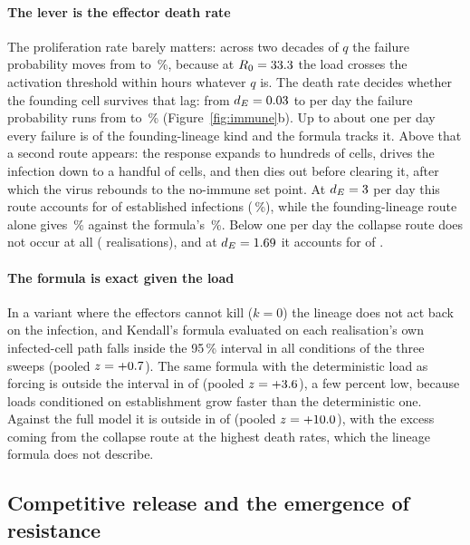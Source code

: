\paragraph{The lever is the effector death rate}
The proliferation rate barely matters: across two decades of $q$ the failure probability moves from \ImmFailQLow{} to \ImmFailQHigh\,\%, because at $R_0 = 33.3$ the load crosses the activation threshold within hours whatever $q$ is. The death rate decides whether the founding cell survives that lag: from $d_E = 0.03$ to \ImmDeMax{} per day the failure probability runs from \ImmFailDeMin{} to \ImmFailDeMax\,\% (Figure~\ref{fig:immune}b). Up to about one per day every failure is of the founding-lineage kind and the formula tracks it. Above that a second route appears: the response expands to hundreds of cells, drives the infection down to a handful of cells, and then dies out before clearing it, after which the virus rebounds to the no-immune set point. At $d_E = 3$ per day this route accounts for \ImmCollapseDeMaxN{} of \ImmCollapseDeMaxEst{} established infections (\ImmCollapseDeMaxPct\,\%), while the founding-lineage route alone gives \ImmFailDeMaxEarly\,\% against the formula's \ImmFailDeMaxTheory\,\%. Below one per day the collapse route does not occur at all (\ImmCollapseBelowOne{} realisations), and at $d_E = 1.69$ it accounts for \ImmCollapseMidN{} of \ImmCollapseMidEst.

\paragraph{The formula is exact given the load}
In a variant where the effectors cannot kill ($k = 0$) the lineage does not act back on the infection, and Kendall's formula evaluated on each realisation's own infected-cell path falls inside the 95\,\% interval in all \ImmConditions{} conditions of the three sweeps (pooled $z = +0.7$). The same formula with the deterministic load as forcing is outside the interval in \ImmKzeroDetOutside{} of \ImmConditions{} (pooled $z = +3.6$), a few percent low, because loads conditioned on establishment grow faster than the deterministic one. Against the full model it is outside in \ImmFullDetOutside{} of \ImmConditions{} (pooled $z = +10.0$), with the excess coming from the collapse route at the highest death rates, which the lineage formula does not describe.

\subsection{Competitive release and the emergence of resistance}
\label{sec:resistance}

